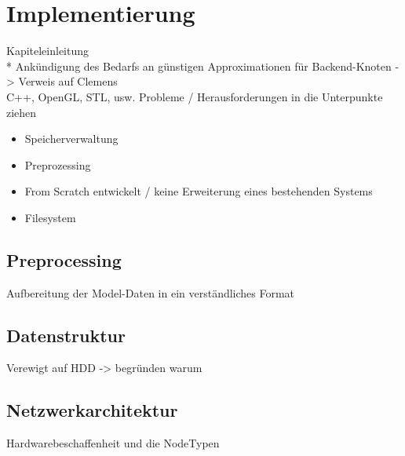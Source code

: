 
\chapter{Implementierung}
\label{chap:impl}
Kapiteleinleitung\\*
Ankündigung des Bedarfs an günstigen Approximationen für Backend-Knoten -> Verweis auf Clemens\\
C++, OpenGL, STL, usw.
Probleme / Herausforderungen in die Unterpunkte ziehen
\begin{itemize}
 \item Speicherverwaltung
 \item Preprozessing
 \item From Scratch entwickelt / keine Erweiterung eines bestehenden Systems
 \item Filesystem
\end{itemize}

\section{Preprocessing}
\label{sec:impl:preprocessing}
Aufbereitung der Model-Daten in ein verständliches Format

\section{Datenstruktur}
\label{sec:impl:datenstruktur}
Verewigt auf HDD -> begründen warum

\section{Netzwerkarchitektur}
\label{sec:impl:netzwerkarchitektur}
Hardwarebeschaffenheit und die NodeTypen

